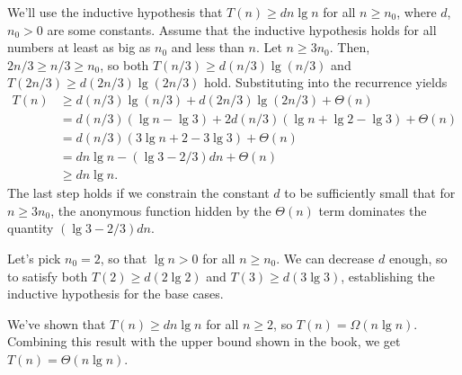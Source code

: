 We'll use the inductive hypothesis that $T(n)\ge dn\lg n$ for all $n\ge n_0$, where $d$, $n_0>0$ are some constants.
Assume that the inductive hypothesis holds for all numbers at least as big as $n_0$ and less than $n$.
Let $n\ge3n_0$.
Then, $2n/3\ge n/3\ge n_0$, so both $T(n/3)\ge d(n/3)\lg(n/3)$ and $T(2n/3)\ge d(2n/3)\lg(2n/3)$ hold.
Substituting into the recurrence yields
\begin{align*}
    T(n) &\ge d(n/3)\lg(n/3)+d(2n/3)\lg(2n/3)+\Theta(n) \\
    &= d(n/3)(\lg n-\lg3)+2d(n/3)(\lg n+\lg2-\lg3)+\Theta(n) \\
    &= d(n/3)(3\lg n+2-3\lg3)+\Theta(n) \\
    &= dn\lg n-(\lg3-2/3)dn+\Theta(n) \\
    &\ge dn\lg n.
\end{align*}
The last step holds if we constrain the constant $d$ to be sufficiently small that for $n\ge3n_0$, the anonymous function hidden by the $\Theta(n)$ term dominates the quantity $(\lg3-2/3)dn$.

Let's pick $n_0=2$, so that $\lg n>0$ for all $n\ge n_0$.
We can decrease $d$ enough, so to satisfy both $T(2)\ge d(2\lg2)$ and $T(3)\ge d(3\lg3)$, establishing the inductive hypothesis for the base cases.

We've shown that $T(n)\ge dn\lg n$ for all $n\ge2$, so $T(n)=\Omega(n\lg n)$.
Combining this result with the upper bound shown in the book, we get $T(n)=\Theta(n\lg n)$.
